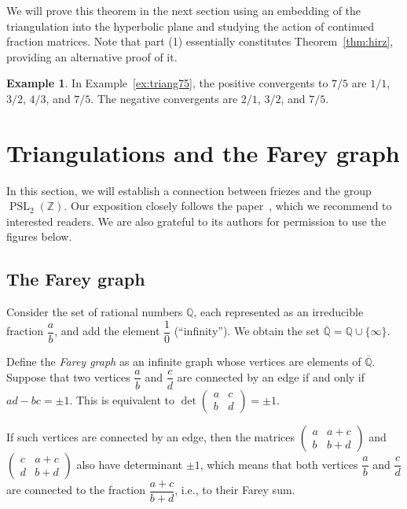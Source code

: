 \documentclass[a4paper,11pt]{amsart}
\newcommand{\QQ}{{\mathbb{Q}}}
\newcommand{\ZZ}{{\mathbb{Z}}}
\newcommand{\PSL}{\mathop{\mathrm{PSL}}}
\theoremstyle{plain}
\theoremstyle{remark}
\theoremstyle{definition}
\newtheorem{example}[theorem]{Example}
\numberwithin{equation}{section}
\numberwithin{figure}{section}
\begin{document}
We will prove this theorem in the next section using an embedding of the triangulation into the hyperbolic plane and studying the action of continued fraction matrices. Note that part (1) essentially constitutes Theorem~\ref{thm:hirz}, providing an alternative proof of it.

\begin{example} In Example~\ref{ex:triang75}, the positive convergents to $7/5$ are $1/1$, $3/2$, $4/3$, and $7/5$. The negative convergents are $2/1$, $3/2$, and $7/5$.
\end{example}


\section{Triangulations and the Farey graph}

In this section, we will establish a connection between friezes and the group $\PSL_2(\ZZ)$. Our exposition closely follows the paper~\cite{Farey1}, which we recommend to interested readers. We are also grateful to its authors for permission to use the figures below.

\subsection{The Farey graph}

Consider the set of rational numbers $\QQ$, each represented as an irreducible fraction $\dfrac ab$, and add the element $\dfrac 10$ (``infinity''). We obtain the set $\overline\QQ=\QQ\cup\{\infty\}$.

Define the \emph{Farey graph} as an infinite graph whose vertices are elements of $\overline\QQ$. Suppose that two vertices $\dfrac ab$ and $\dfrac cd$ are connected by an edge if and only if $ad-bc=\pm 1$. This is equivalent to $\det\begin{pmatrix}a &c\\b &d\end{pmatrix}=\pm 1$.

If such vertices are connected by an edge, then the matrices $\begin{pmatrix}a &a+c\\b &b+d\end{pmatrix}$ and $\begin{pmatrix}c &a+c\\d &b+d\end{pmatrix}$ also have determinant $\pm 1$, which means that both vertices $\dfrac ab$ and $\dfrac cd$ are connected to the fraction $\dfrac{a+c}{b+d}$, i.e., to their Farey sum.
\end{document}
